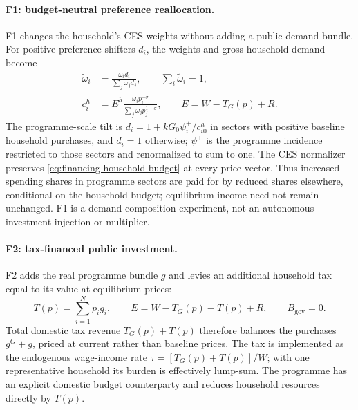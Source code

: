 \paragraph{F1: budget-neutral preference reallocation.}
F1 changes the household's CES weights without adding a public-demand
bundle. For positive preference shifters $d_i$, the weights and gross
household demand become
\begin{align}
\widetilde{\omega}_i
 &= \frac{\omega_i d_i}{\sum_j\omega_j d_j},
\qquad \sum_i\widetilde{\omega}_i = 1,
\label{eq:closure-f1-weights}\\
c_i^h
 &= E^h\frac{\widetilde{\omega}_i p_i^{-\sigma}}
 {\sum_j\widetilde{\omega}_j p_j^{1-\sigma}},
\qquad E = W-T_G(p)+R.
\label{eq:closure-f1}
\end{align}
The programme-scale tilt is $d_i = 1+kG_0\psi_i^+/c_{i0}^h$ in sectors
with positive baseline household purchases, and $d_i=1$ otherwise;
$\psi^+$ is the programme incidence restricted to those sectors and
renormalized to sum to one. The CES normalizer preserves
\eqref{eq:financing-household-budget} at every price vector. Thus increased
spending shares in programme sectors are paid for by reduced shares
elsewhere, conditional on the household budget; equilibrium income need
not remain unchanged. F1 is a demand-composition experiment, not an
autonomous investment injection or multiplier.

\paragraph{F2: tax-financed public investment.}
F2 adds the real programme bundle $g$ and levies an additional household
tax equal to its value at equilibrium prices:
\begin{equation}
T(p) = \sum_{i=1}^N p_i g_i,
\qquad E = W-T_G(p)-T(p)+R,
\qquad B_{\mathrm{gov}}=0.
\label{eq:closure-f2}
\end{equation}
Total domestic tax revenue $T_G(p)+T(p)$ therefore balances the purchases
$g^G+g$, priced at current rather than baseline prices. The tax is
implemented as the endogenous wage-income rate
$\tau=[T_G(p)+T(p)]/W$; with one representative household its burden is
effectively lump-sum. The programme has an explicit domestic budget
counterparty and reduces household resources directly by $T(p)$.

